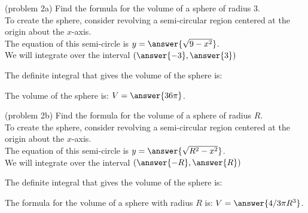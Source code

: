 \documentclass[handout]{ximera}
\begin{document}
\begin{problem}(problem 2a)
Find the formula for the volume of a sphere of radius $3$.\\

To create the sphere, consider revolving a semi-circular region centered at the origin about the $x$-axis.\\
The equation of this semi-circle is $y = \answer{\sqrt{9-x^2}}$.\\
We will integrate over the interval $\left(\answer{-3},\answer{3}\right)$

The definite integral that gives the volume of the sphere is:\\
\begin{multipleChoice}
\end{multipleChoice}

The volume of the sphere is: \;  $V = \answer{36 \pi }$.


\end{problem}



\begin{problem}(problem 2b)
Find the formula for the volume of a sphere of radius $R$.\\

To create the sphere, consider revolving a semi-circular region centered at the origin about the $x$-axis.\\
The equation of this semi-circle is $y = \answer{\sqrt{R^2-x^2}}$.\\
We will integrate over the interval $\left(\answer{-R},\answer{R}\right)$

The definite integral that gives the volume of the sphere is:\\
\begin{multipleChoice}
\end{multipleChoice}

The formula for the volume of a sphere with radius $R$ is: \; $V = \answer{4/3 \pi R^3 }$.
\end{problem}
\end{document}
